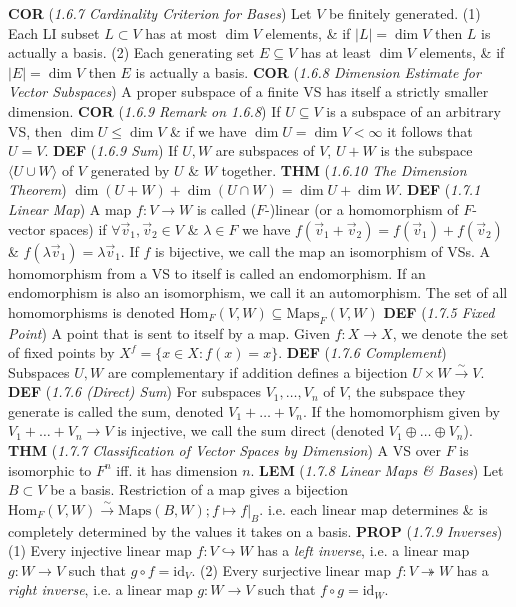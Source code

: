 \documentclass{article}
\newcommand{\wde}[1]{\textcolor{defc}{\textbf{DEF}} (\textcolor{namec}{\textit{#1}})}
\newcommand{\wl}[1]{\textcolor{lemc}{\textbf{LEM}} (\textcolor{namec}{\textit{#1}})}
\newcommand{\wc}[1]{\textcolor{corc}{\textbf{COR}} (\textcolor{namec}{\textit{#1}})}
\newcommand{\wpr}[1]{\textcolor{propc}{\textbf{PROP}} (\textcolor{namec}{\textit{#1}})}
\newcommand{\wt}[1]{\textcolor{thmc}{\textbf{THM}} (\textcolor{namec}{\textit{#1}})}
\newcommand{\Maps}[0]{\text{Maps}}
\newcommand{\Hom}[0]{\text{Hom}}
\newcommand{\id}[0]{\text{id}}
\newcommand{\iso}[0]{\stackrel{\sim}{\to}}
\begin{document}
\begin{multicols}{2}
  \wc{1.6.7 Cardinality Criterion for Bases} Let $V$ be finitely generated.
  (1) Each LI subset $L \subset V$ has at most $\dim V$ elements, \& if $|L| = \dim V$ then $L$ is actually a basis.
  (2) Each generating set $E \subseteq V$ has at least $\dim V$ elements, \& if $|E| = \dim V$ then $E$ is actually a basis.
  \wc{1.6.8 Dimension Estimate for Vector Subspaces} A proper subspace of a finite VS has itself a strictly smaller dimension.
  \wc{1.6.9 Remark on 1.6.8} If $U \subseteq V$ is a subspace of an arbitrary VS, then $\dim U \le \dim V$ \& if we have $\dim U = \dim V < \infty$ it follows that $U = V$.
  \wde{1.6.9 Sum} If $U,W$ are subspaces of $V$, $U + W$ is the subspace $\langle U \cup W \rangle$ of $V$ generated by $U$ \& $W$ together.
  \wt{1.6.10 The Dimension Theorem} $\dim(U + W) + \dim(U \cap W) = \dim U + \dim W$.
  \wde{1.7.1 Linear Map} A map $f : V \to W$ is called ($F$-)linear (or a homomorphism of $F$-vector spaces) if $\forall \vec{v}_{1}, \vec{v}_{2} \in V$ \& $\lambda \in F$ we have $f(\vec{v}_{1} + \vec{v}_{2}) = f(\vec{v}_{1}) + f(\vec{v}_{2})$ \& $f(\lambda \vec{v}_{1}) = \lambda \vec{v}_{1}$. If $f$ is bijective, we call the map an isomorphism of VSs. A homomorphism from a VS to itself is called an endomorphism. If an endomorphism is also an isomorphism, we call it an automorphism. The set of all homomorphisms is denoted $\Hom_{F}(V,W) \subseteq \Maps_{F}(V,W)$
  \wde{1.7.5 Fixed Point} A point that is sent to itself by a map. Given $f : X \to X$, we denote the set of fixed points by $X^{f} = \{x \in X : f(x) = x\}$.
  \wde{1.7.6 Complement} Subspaces $U,W$ are complementary if addition defines a bijection $U \times W \iso V$.
  \wde{1.7.6 (Direct) Sum} For subspaces $V_{1}, \dots, V_{n}$ of $V$, the subspace they generate is called the sum, denoted $V_{1} + \dots + V_{n}$. If the homomorphism given by $V_{1} + \dots + V_{n} \to V$ is injective, we call the sum direct (denoted $V_{1} \oplus \dots \oplus V_{n}$).
  \wt{1.7.7 Classification of Vector Spaces by Dimension} A VS over $F$ is isomorphic to $F^{n}$ iff. it has dimension $n$.
  \wl{1.7.8 Linear Maps \& Bases} Let $B \subset V$ be a basis. Restriction of a map gives a bijection $\Hom_{F}(V, W) \iso \Maps(B, W); f \mapsto f |_{B}$. i.e. each linear map determines \& is completely determined by the values it takes on a basis.
  \wpr{1.7.9 Inverses}
  (1) Every injective linear map $f : V \hookrightarrow W$ has a \emph{left inverse}, i.e. a linear map $g : W \to V$ such that $g \circ f = \id_{V}$.
  (2) Every surjective linear map $f : V \twoheadrightarrow W$ has a \emph{right inverse}, i.e. a linear map $g : W \to V$ such that $f \circ g = \id_{W}$.

\end{multicols}
\end{document}
